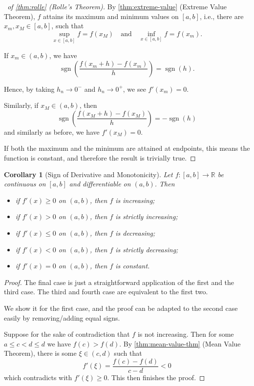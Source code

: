 \documentclass[11pt]{article}
\numberwithin{equation}{section}
\newtheorem{corollary}[theorem]{Corollary}
\theoremstyle{definition}
\theoremstyle{remark}
\newcommand{\pqty}[1]{\left(#1\right)}
\newcommand{\ccintv}[2]{[#1,#2]}
\newcommand{\oointv}[2]{(#1,#2)}
\newcommand{\functiondomain}[3]{#1:#2\to #3}
\newcommand{\RR}{\mathbb R}
\newcommand{\qand}{\quad\text{and}\quad}
\DeclareMathOperator{\sign}{sgn}
\begin{document}
\begin{proof}[\proofname\ of \autoref{thm:rolle} (Rolle's Theorem)]
    By \autoref{thm:extreme-value} (Extreme Value Theorem), \(f\) attains its maximum and minimum values on \(\ccintv{a}{b}\), i.e., there are \(x_m, x_M \in \ccintv{a}{b}\), such that
    \[
        \sup_{x \in \ccintv{a}{b}} f = f\pqty{x_M} \qand \inf_{x \in \ccintv{a}{b}} f = f\pqty{x_m}.
    \]

    If \(x_m \in \oointv{a}{b}\), we have
    \[
        \sign \pqty{\frac{f\pqty{x_m + h} - f\pqty{x_m}}{{h}}} = \sign \pqty{h}.
    \]

    Hence, by taking \(h_n \to 0^-\) and \(h_n \to 0^+\), we see \(f'\pqty{x_m} = 0\).

    Similarly, if \(x_M \in \oointv{a}{b}\), then
    \[
        \sign \pqty{\frac{f\pqty{x_M + h} - f\pqty{x_M}}{h}} = - \sign\pqty{h}
    \]
    and similarly as before, we have \(f'\pqty{x_M} = 0\).

    If both the maximum and the minimum are attained at endpoints, this means the function is constant, and therefore the result is trivially true.
\end{proof}

\begin{corollary}[Sign of Derivative and Monotonicity]\label{analysis-unit-0114}
    \label{cor:sign-of-derivative-monotonicity}%
    Let \(\functiondomain{f}{\ccintv{a}{b}}{\RR}\) be continuous on \(\ccintv{a}{b}\) and differentiable on \(\oointv{a}{b}\). Then
    \begin{itemize}
        \item if \(f'\pqty{x} \geq 0\) on \(\oointv{a}{b}\), then \(f\) is increasing;
        \item if \(f'\pqty{x} > 0\) on \(\oointv{a}{b}\), then \(f\) is strictly increasing;
        \item if \(f'\pqty{x} \leq 0\) on \(\oointv{a}{b}\), then \(f\) is decreasing;
        \item if \(f'\pqty{x} < 0\) on \(\oointv{a}{b}\), then \(f\) is strictly decreasing;
        \item if \(f'\pqty{x} = 0\) on \(\oointv{a}{b}\), then \(f\) is constant.
    \end{itemize}
\end{corollary}

\begin{proof}
    The final case is just a straightforward application of the first and the third case. The third and fourth case are equivalent to the first two.

    We show it for the first case, and the proof can be adapted to the second case easily by removing/adding equal signs.

    Suppose for the sake of contradiction that \(f\) is not increasing. Then for some \(a \leq c < d \leq d\) we have \(f\pqty{c} > f\pqty{d}\). By \autoref{thm:mean-value-thm} (Mean Value Theorem), there is some \(\xi \in \oointv{c}{d}\) such that
    \[
        f'\pqty{\xi} = \frac{f\pqty{c} - f\pqty{d}}{c - d} < 0
    \]
    which contradicts with \(f'\pqty{\xi} \geq 0\). This then finishes the proof.
\end{proof}
\end{document}
